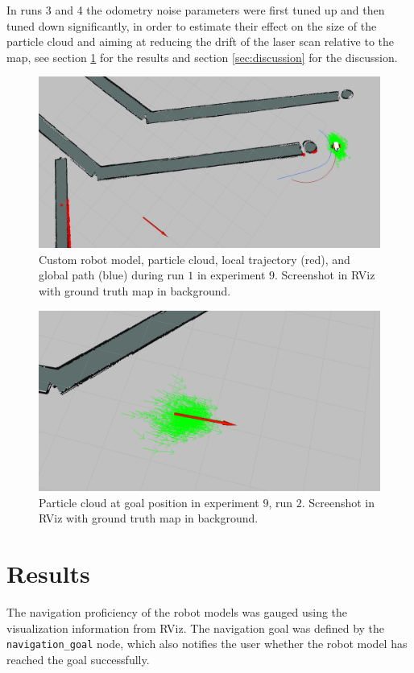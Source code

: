 \documentclass[10pt,journal,compsoc]{IEEEtran}
\begin{document}
In runs 3 and 4 the odometry noise parameters were first tuned up and then tuned down significantly, in order to estimate their effect on the size of the particle cloud and aiming at reducing the drift of the laser scan relative to the map, see section \ref{sec:results} for the results and section \ref{sec:discussion} for the discussion.

\begin{figure}[thpb]
      \centering
      \includegraphics[width=\linewidth]{images/exp_9_run_1.PNG}
      \caption{Custom robot model, particle cloud, local trajectory (red), and global path (blue) during run $1$ in experiment $9$. Screenshot in RViz with ground truth map in background.}
      \label{fig:result_experiment_9-1}
\end{figure}

\begin{figure}[thpb]
      \centering
      \includegraphics[width=\linewidth]{images/exp_9_run_2_goal.PNG}
      \caption{Particle cloud at goal position in experiment $9$, run $2$. Screenshot in RViz with ground truth map in background.}
      \label{fig:result_experiment_9-2}
\end{figure}

\section{Results}
\label{sec:results}
The navigation proficiency of the robot models was gauged using the visualization information from RViz. The navigation goal was defined by the \texttt{navigation\_goal} node, which also notifies the user whether the robot model has reached the goal successfully.
\end{document}
